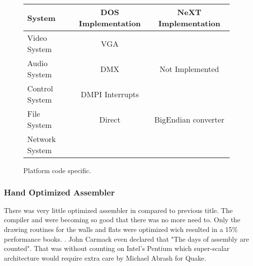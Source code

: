  \begin{figure}[H]
\centering  
\begin{tabularx}{\textwidth}{ L{0.22} | C{0.39} | C{0.39} }
  \toprule
  \textbf{System} & \textbf{DOS Implementation} & \textbf{NeXT Implementation}\\
  \toprule 
    Video System & VGA &  \\
    Audio System & DMX & Not Implemented\\
    Control System & DMPI Interrupts &  \\
    File  System & Direct & BigEndian converter\\
    Network System &  &  \\
   \toprule
\end{tabularx}
\caption{Platform code specific.}
\end{figure}

\par


\subsubsection{Hand Optimized Assembler}
There was very little optimized assembler in \doom compared to previous title. The compiler and  were becoming so good that there was no more need to. Only the drawing routines for the walls and flats were optimized wich resulted in a 15\% performance books. . John Carmack even declared that "The days of assembly are counted". That was without counting on Intel's Pentium which super-scalar architecture would require extra care by Michael Abrash for Quake.
